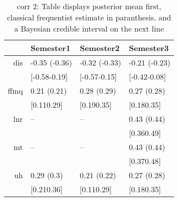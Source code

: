\begin{table}[ht]
\centering
\begin{tabular}{rlll}
  \hline
 & Semester1 & Semester2 & Semester3 \\ 
  \hline
dis & -0.35 (-0.36) & -0.32 (-0.33) & -0.21 (-0.23) \\ 
   & [-0.58-0.19] & [-0.57-0.15] & [-0.42-0.08] \\ 
  ffmq & 0.21 (0.21) & 0.28 (0.29) & 0.27 (0.28) \\ 
     & [0.110.29] & [0.190.35] & [0.180.35] \\ 
  lnr & -- & -- & 0.43 (0.44) \\ 
       &  &  & [0.360.49] \\ 
  mt & -- & -- & 0.43 (0.44) \\ 
         &  &  & [0.370.48] \\ 
  uh & 0.29 (0.3) & 0.21 (0.22) & 0.27 (0.28) \\ 
           & [0.210.36] & [0.110.29] & [0.180.35] \\ 
   \hline
\end{tabular}
\caption{corr 2: Table displays posterior mean first, classical frequentist estimate in paranthesis, and a Bayesian credible interval on the next line} 
\label{corr_2}
\end{table}
